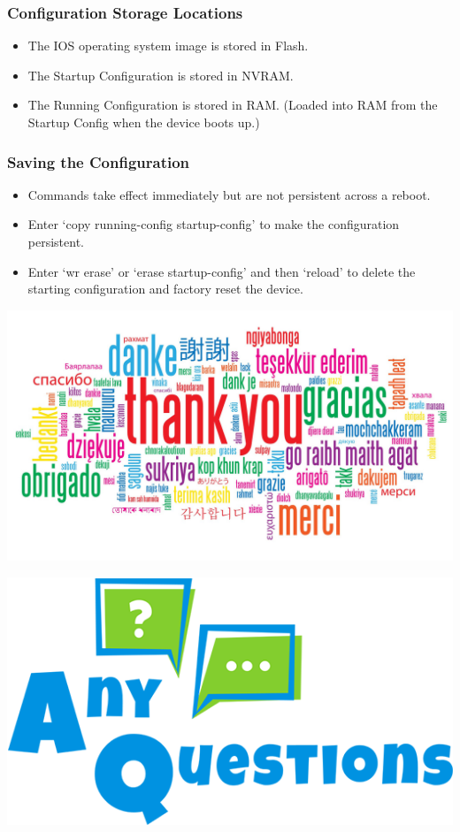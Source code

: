 \documentclass[pdflatex,compress]{beamer}
\begin{document}
\begin{frame}
	\frametitle{Configuration Storage Locations}
	\begin{itemize}
		\item The IOS operating system image is stored in Flash.
		\item The Startup Configuration is stored in NVRAM.
		\item The Running Configuration is stored in RAM. (Loaded into RAM from the Startup Config when the device boots up.)
	\end{itemize}
\end{frame}

\begin{frame}
	\frametitle{Saving the Configuration}
	\begin{itemize}
		\item Commands take effect immediately but are not persistent across a reboot.
		\item Enter ‘copy running-config startup-config’ to make the configuration persistent.
		\item Enter ‘wr erase’ or ‘erase startup-config’ and then ‘reload’ to delete the starting configuration and factory reset the device.
	\end{itemize}
\end{frame}

\begin{frame}
	\begin{center}
		\includegraphics[width=1\linewidth]{../../img/thank_you}
	\end{center}
\end{frame}

\begin{frame}
	\begin{center}
		\includegraphics[width=1\linewidth]{../../img/any_questions}
	\end{center}
\end{frame}
\end{document}
